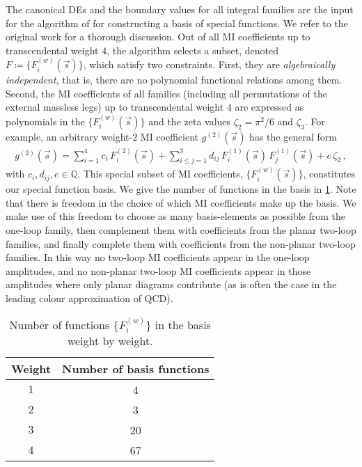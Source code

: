 \documentclass[main.tex]{subfiles}
\begin{document}
The canonical \acp{DE}  and the boundary values for all integral families are the input for the algorithm of  for constructing a basis of special functions. We refer to the original work for a thorough discussion. 
Out of all \ac{MI} coefficients up to transcendental weight $4$, the algorithm selects a subset, denoted $F \coloneqq \{F^{(w)}_i(\vec{s})\}$, which satisfy two constraints. 
First, they are \emph{algebraically independent}, that is, there are no polynomial functional relations among them. Second, the \ac{MI} coefficients of all families (including all permutations of the external massless legs) up to transcendental weight $4$ are expressed as polynomials in the $\{F^{(w)}_i(\vec{s})\}$ and the zeta values $\zeta_2 = \pi^2/6$ and $\zeta_3$. For example, an arbitrary weight-$2$ \ac{MI} coefficient $g^{(2)}(\vec{s})$ has the general form
\begin{align}
g^{(2)}(\vec{s}) = \sum_{i=1}^{4} c_i \, F_i^{(2)}(\vec{s}) + \sum_{i \le j =1}^{3} d_{ij} \, F_i^{(1)}(\vec{s}) \,  F_j^{(1)}(\vec{s}) + e \, \zeta_2 \,,
\end{align}
with $c_i, d_{ij}, e \in \mathbb{Q}$. This special subset of \ac{MI} coefficients, $\{F^{(w)}_i(\vec{s})\}$, constitutes our special function basis. 
We give the number of functions in the basis in \cref{tab:func_basis}. Note that there is freedom in the choice of which \ac{MI} coefficients make up the basis. We make use of this freedom to choose as many basis-elements as possible from the one-loop family, then complement them with coefficients from the planar two-loop families, and finally complete them with coefficients from the non-planar two-loop families. In this way no two-loop \ac{MI} coefficients appear in the one-loop amplitudes, and no non-planar two-loop \ac{MI} coefficients appear in those amplitudes where only planar diagrams contribute (as is often the case in the leading colour approximation of QCD).

\begin{table}
    \centering
    \begin{tabular}{cc}
        \hline
        Weight & Number of basis functions \\
        \hline
        $1$ & 4 \\
        $2$ & 3 \\
        $3$ & 20 \\
        $4$ & 67 \\
        \hline
    \end{tabular}
    \caption{Number of functions $\{F^{(w)}_i\}$ in the basis weight by weight.}
    \label{tab:func_basis}
\end{table}
\end{document}
